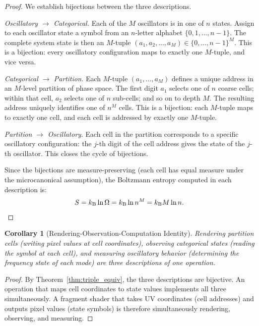 \documentclass[11pt,twocolumn,a4paper]{article}
\newtheorem{corollary}[theorem]{Corollary}
\theoremstyle{definition}
\theoremstyle{remark}
\newcommand{\kB}{k_{\mathrm{B}}}
\begin{document}
\begin{proof}
We establish bijections between the three descriptions.

\emph{Oscillatory $\to$ Categorical.} Each of the $M$ oscillators is in one of $n$ states. Assign to each oscillator state a symbol from an $n$-letter alphabet $\{0, 1, \ldots, n-1\}$. The complete system state is then an $M$-tuple $(a_1, a_2, \ldots, a_M) \in \{0, \ldots, n-1\}^M$. This is a bijection: every oscillatory configuration maps to exactly one $M$-tuple, and vice versa.

\emph{Categorical $\to$ Partition.} Each $M$-tuple $(a_1, \ldots, a_M)$ defines a unique address in an $M$-level partition of phase space. The first digit $a_1$ selects one of $n$ coarse cells; within that cell, $a_2$ selects one of $n$ sub-cells; and so on to depth $M$. The resulting address uniquely identifies one of $n^M$ cells. This is a bijection: each $M$-tuple maps to exactly one cell, and each cell is addressed by exactly one $M$-tuple.

\emph{Partition $\to$ Oscillatory.} Each cell in the partition corresponds to a specific oscillatory configuration: the $j$-th digit of the cell address gives the state of the $j$-th oscillator. This closes the cycle of bijections.

Since the bijections are measure-preserving (each cell has equal measure under the microcanonical assumption), the Boltzmann entropy computed in each description is:
\[
S = \kB \ln \Omega = \kB \ln n^M = \kB M \ln n. \qedhere
\]
\end{proof}

\begin{corollary}[Rendering-Observation-Computation Identity]
\label{cor:render_obs_comp}
Rendering partition cells (writing pixel values at cell coordinates), observing categorical states (reading the symbol at each cell), and measuring oscillatory behavior (determining the frequency state of each mode) are three descriptions of one operation.
\end{corollary}

\begin{proof}
By Theorem~\ref{thm:triple_equiv}, the three descriptions are bijective. An operation that maps cell coordinates to state values implements all three simultaneously. A fragment shader that takes UV coordinates (cell addresses) and outputs pixel values (state symbols) is therefore simultaneously rendering, observing, and measuring.
\end{proof}
\end{document}
